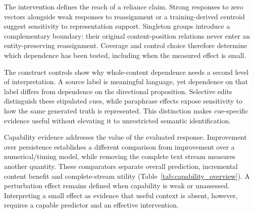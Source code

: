 The intervention defines the reach of a reliance claim. Strong responses to zero vectors alongside weak responses to reassignment or a training-derived centroid suggest sensitivity to representation support. Singleton groups introduce a complementary boundary: their original content-position relations never enter an entity-preserving reassignment. Coverage and control choice therefore determine which dependence has been tested, including when the measured effect is small.

The construct controls show why whole-content dependence needs a second level of interpretation. A source label is meaningful language, yet dependence on that label differs from dependence on the directional proposition. Selective edits distinguish these stipulated cues, while paraphrase effects expose sensitivity to how the same generated truth is represented. This distinction makes cue-specific evidence useful without elevating it to unrestricted semantic identification.

Capability evidence addresses the value of the evaluated response. Improvement over persistence establishes a different comparison from improvement over a numerical/timing model, while removing the complete text stream measures another quantity. These comparators separate overall prediction, incremental content benefit and complete-stream utility (Table~\ref{tab:capability_overview}). A perturbation effect remains defined when capability is weak or unassessed. Interpreting a small effect as evidence that useful context is absent, however, requires a capable predictor and an effective intervention.
